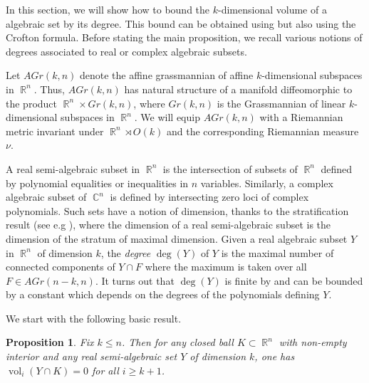 \documentclass[12pt]{amsbook}%
\newtheorem{prop}[thm]{Proposition}
\theoremstyle{definition}
\theoremstyle{remark}
\numberwithin{section}{chapter}
\numberwithin{subsection}{section}
\numberwithin{figure}{chapter}
\DeclareMathOperator{\C}{\mathbb{C}}
\DeclareMathOperator{\vol}{vol}
\DeclareMathOperator{\R}{\mathbb{R}}
\def\kap{}
\def\zhao{\color{red}}
\begin{document}
{{In this section, we will show  how to bound the $k$-dimensional volume of a algebraic set by its degree. 
This bound can be obtained using \cite[p. 239, Triangulation lemma]{gromov_entropy_semi_algebraic} but also using the Crofton formula. 
Before stating the main proposition, we recall various  notions of degrees associated to real or complex algebraic subsets. 

Let $AGr(k,n)$ denote the affine grassmannian of affine $k$-dimensional subspaces in $\R^n$. Thus, $AGr(k,n)$ has natural structure of a manifold diffeomorphic 
to the product $\R^n\times Gr(k,n)$, where $Gr(k,n)$ is the Grassmannian of linear $k$-dimensional subspaces in $\R^n$. We will equip $AGr(k,n)$ with a 
Riemannian metric invariant under $\R^n \rtimes O(k)$ and the corresponding Riemannian measure $\nu$. 

A {real semi-algebraic subset} in $\R^n$ is %
the intersection of subsets of $\R^n$ defined by polynomial equalities or inequalities in $n$ variables. 
Similarly, a complex algebraic subset of $\C^n$ is defined by intersecting zero loci of complex polynomials. 
Such sets have a notion of dimension, thanks to the stratification result (see e.g \cite[Proposition 4.4]{yomdin_comte}), where the dimension of a real semi-algebraic subset is the dimension of the stratum of maximal dimension.
Given a real algebraic subset $Y$ in $\R^n$ of dimension $k$, the {\em degree} $\deg(Y)$ of $Y$ is the maximal number of connected components of 
$Y \cap F$ where the maximum is taken over all $F\in AGr(n-k,n)$.   
It turns out that $\deg(Y)$ is finite by \cite[Corollary 4.9]{yomdin_comte} and can be bounded by a 
constant which depends on the degrees of the polynomials defining $Y$. 
%

We start with the following basic result. 

\begin{prop} Fix $k \leqslant n$. Then for any closed ball $K \subset \R^n$ with non-empty interior and any real semi-algebraic set $Y$ of dimension $k $, one has $\vol_i(Y\cap K)=0$ for all $i \geqslant k +1$. 
\end{prop}

}}
\end{document}
